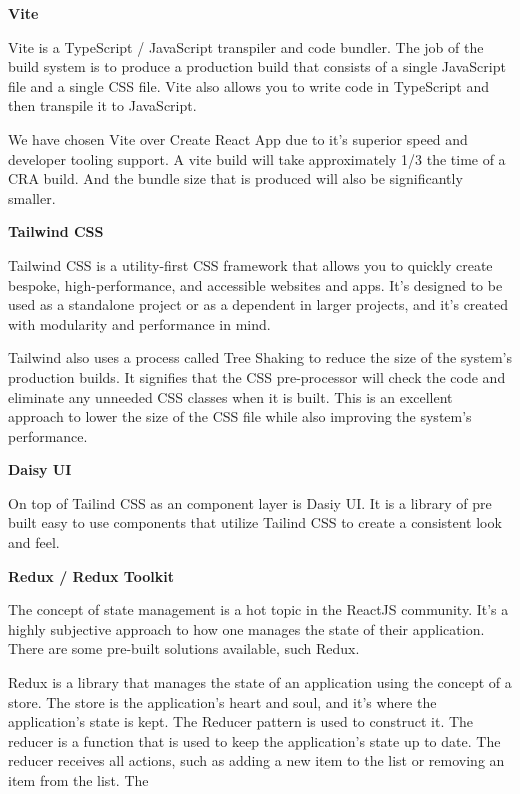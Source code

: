 \textbf{Vite}


Vite is a TypeScript / JavaScript transpiler and code bundler. The job of the build system is to produce a production build that consists of a single JavaScript file and a single CSS file. Vite also allows you to write code in TypeScript and then transpile it to JavaScript.


We have chosen Vite over Create React App due to it's superior speed and developer tooling support. A vite build will take approximately 1/3 the time of a CRA build. And the bundle size that is produced will also be significantly smaller.


\hspace{5mm}


\textbf{Tailwind CSS}


Tailwind CSS is a utility-first CSS framework that allows you to quickly create bespoke, high-performance, and accessible websites and apps. It's designed to be used as a standalone project or as a dependent in larger projects, and it's created with modularity and performance in mind.

Tailwind also uses a process called Tree Shaking to reduce the size of the system's production builds. It signifies that the CSS pre-processor will check the code and eliminate any unneeded CSS classes when it is built. This is an excellent approach to lower the size of the CSS file while also improving the system's performance.

\hspace{5mm}



\textbf{Daisy UI}

On top of Tailind CSS as an component layer is Dasiy UI. It is a library of pre built easy to use components that utilize Tailind CSS to create a consistent look and feel.


\hspace{5mm}


\textbf{Redux / Redux Toolkit}

The concept of state management is a hot topic in the ReactJS community. It's a highly subjective approach to how one manages the state of their application. There are some pre-built solutions available, such Redux.

Redux is a library that manages the state of an application using the concept of a store. The store is the application's heart and soul, and it's where the application's state is kept. The Reducer pattern is used to construct it. The reducer is a function that is used to keep the application's state up to date. The reducer receives all actions, such as adding a new item to the list or removing an item from the list. The

